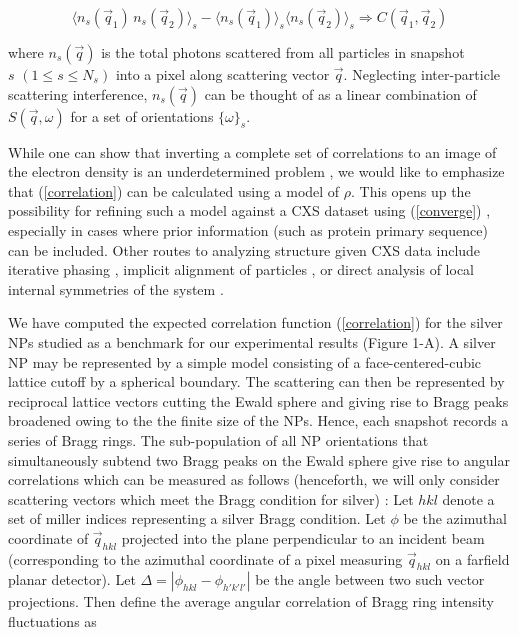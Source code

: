 \documentclass [11pt,fleqn]{article}
\def \be {\begin{equation}}
\def \ee {\end{equation}}
\begin{document}
\be \label{converge}
\langle n_{s}(\vec{q}_1) \, n_{s}(\vec{q}_2) \rangle_{s} - \langle n_{s}(\vec{q}_1) \rangle_{s} \langle  n_{s}(\vec{q}_2) \rangle_{s}  \Rightarrow C(\vec{q}_1, \vec{q}_2) 
\ee


where $n_{s}(\vec{q})$ is the total photons scattered from all particles in snapshot $s \,\,(1 \leq s \leq N_{s} )$ into a pixel along scattering vector $\vec{q}$. Neglecting inter-particle scattering interference, $n_{s}(\vec{q})$ can be thought of as a linear combination of $S(\vec{q},\omega)$ for a set of orientations $\{ \omega\}_{s}$. 

While one can show that inverting a complete set of correlations to an image of the electron density is an underdetermined problem \cite{Elser:2011ez}, we would like to emphasize that (\ref{correlation}) can be calculated using a model of $\rho$. This opens up the possibility for refining such a model against a CXS dataset using (\ref{converge}) \cite{Liu:2013dv, Chen:2013io, Saldin:2009jj}, especially in cases where prior information (such as protein primary sequence) can be included. Other routes to analyzing structure given CXS data include iterative phasing \cite{Saldin:2010bx}, implicit alignment of particles \cite{Poon:2013ia}, or direct analysis of local internal symmetries of the system \cite{Kurta:2012cb, Kurta:2013to}.

We have computed the expected correlation function (\ref{correlation}) for the silver NPs studied as a benchmark for our experimental results (Figure 1-A). A silver NP may be represented by a simple model consisting of a face-centered-cubic lattice cutoff by a spherical boundary. The scattering can then be represented by reciprocal lattice vectors cutting the Ewald sphere and giving rise to Bragg peaks broadened owing to the the finite size of the NPs.  Hence, each snapshot records a series of  Bragg rings. The sub-population of all NP orientations that simultaneously subtend two Bragg peaks on the Ewald sphere give rise to angular correlations which can be measured as follows (henceforth, we will only consider scattering vectors which meet the Bragg condition for silver) :  Let $hkl$ denote a set of miller indices representing a silver Bragg condition. Let $\phi$ be the azimuthal coordinate of $\vec{q}_{hkl}$ projected into the plane perpendicular to an incident beam (corresponding to the azimuthal coordinate of a pixel measuring $\vec{q}_{hkl}$ on a farfield planar detector). Let $\Delta = |\phi_{hkl} - \phi_{h'k'l'}|$ be the angle between two such vector projections. Then define the average angular correlation of Bragg ring intensity fluctuations as
\end{document}
